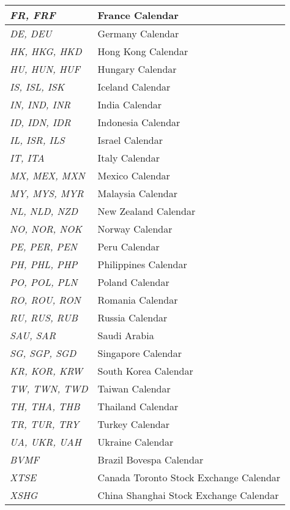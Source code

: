 \begin{longtable}{| p{} | p{} |}
    \emph{FR, FRF} & France Calendar \\ \hline
    \emph{DE, DEU} & Germany Calendar \\ \hline
    \emph{HK, HKG, HKD} & Hong Kong Calendar \\ \hline
    \emph{HU, HUN, HUF} & Hungary Calendar \\ \hline
    \emph{IS, ISL, ISK} & Iceland Calendar \\ \hline
    \emph{IN, IND, INR} & India Calendar \\ \hline
    \emph{ID, IDN, IDR} & Indonesia Calendar \\ \hline
    \emph{IL, ISR, ILS} & Israel Calendar \\ \hline
    \emph{IT, ITA} & Italy Calendar \\ \hline
    \emph{MX, MEX, MXN} & Mexico Calendar \\ \hline
    \emph{MY, MYS, MYR} & Malaysia Calendar \\ \hline
    \emph{NL, NLD, NZD} & New Zealand Calendar\\ \hline
    \emph{NO, NOR, NOK} & Norway Calendar \\ \hline
    \emph{PE, PER, PEN} & Peru Calendar \\ \hline
    \emph{PH, PHL, PHP} & Philippines Calendar \\ \hline
    \emph{PO, POL, PLN} & Poland Calendar \\ \hline
    \emph{RO, ROU, RON} & Romania Calendar \\ \hline
    \emph{RU, RUS, RUB} & Russia Calendar \\ \hline
    \emph{SAU, SAR} & Saudi Arabia \\ \hline
    \emph{SG, SGP, SGD} & Singapore Calendar \\ \hline
    \emph{KR, KOR, KRW} & South Korea Calendar \\ \hline
    \emph{TW, TWN, TWD} & Taiwan Calendar \\ \hline
    \emph{TH, THA, THB} & Thailand Calendar \\ \hline
    \emph{TR, TUR, TRY} & Turkey Calendar \\ \hline
    \emph{UA, UKR, UAH} & Ukraine Calendar \\ \hline
    \emph{BVMF} & Brazil Bovespa Calendar \\ \hline
    \emph{XTSE} & Canada Toronto Stock Exchange Calendar \\ \hline
    \emph{XSHG} & China Shanghai Stock Exchange Calendar \\ \hline

\end{longtable}
